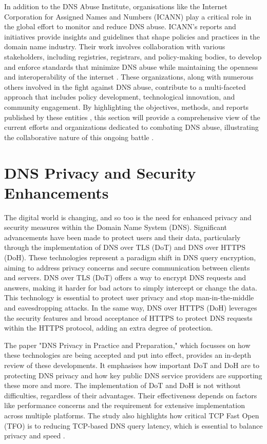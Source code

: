 In addition to the DNS Abuse Institute, organisations like the Internet Corporation for Assigned Names and Numbers (ICANN) play a critical role in the global effort to monitor and reduce DNS abuse. ICANN's reports and initiatives provide insights and guidelines that shape policies and practices in the domain name industry. Their work involves collaboration with various stakeholders, including registries, registrars, and policy-making bodies, to develop and enforce standards that minimize DNS abuse while maintaining the openness and interoperability of the internet \cite{icann2022dnsabuse} . These organizations, along with numerous others involved in the fight against DNS abuse, contribute to a multi-faceted approach that includes policy development, technological innovation, and community engagement.\cite{dnsabuseinstitute2023} By highlighting the objectives, methods, and reports published by these entities  \cite{dnsai2022report}   , this section will provide a comprehensive view of the current efforts and organizations dedicated to combating DNS abuse, illustrating the collaborative nature of this ongoing battle \cite{icann2022dnsabuse} .

\section{DNS Privacy and Security Enhancements}

The digital world is changing, and so too is the need for enhanced privacy and security measures within the Domain Name System (DNS). Significant advancements have been made to protect users and their data, particularly through the implementation of DNS over TLS (DoT) and DNS over HTTPS (DoH). These technologies represent a paradigm shift in DNS query encryption, aiming to address privacy concerns and secure communication between clients and servers. DNS over TLS (DoT) offers a way to encrypt DNS requests and answers, making it harder for bad actors to simply intercept or change the data. This technology is essential to protect user privacy and stop man-in-the-middle and eavesdropping attacks. In the same way, DNS over HTTPS (DoH) leverages the security features and broad acceptance of HTTPS to protect DNS requests within the HTTPS protocol, adding an extra degree of protection.

The paper "DNS Privacy in Practice and Preparation," which focusses on how these technologies are being accepted and put into effect, provides an in-depth review of these developments. It emphasises how important DoT and DoH are to protecting DNS privacy and how key public DNS service providers are supporting these more and more. The implementation of DoT and DoH is not without difficulties, regardless of their advantages. Their effectiveness depends on factors like performance concerns and the requirement for extensive implementation across multiple platforms. The study also highlights how critical TCP Fast Open (TFO) is to reducing TCP-based DNS query latency, which is essential to balance privacy and speed  \cite{acm2023dnsprivacy}  .

